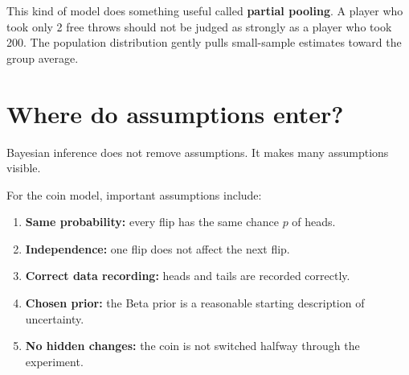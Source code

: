 \documentclass[11pt]{article}
\begin{document}
\begin{center}
\end{center}

This kind of model does something useful called \textbf{partial pooling}. A player who took only 2 free throws should not be judged as strongly as a player who took 200. The population distribution gently pulls small-sample estimates toward the group average.

\section{Where do assumptions enter?}

Bayesian inference does not remove assumptions. It makes many assumptions visible.

\begin{checkbox}
For the coin model, important assumptions include:
\begin{enumerate}[leftmargin=1.5em]
  \item \textbf{Same probability:} every flip has the same chance $p$ of heads.
  \item \textbf{Independence:} one flip does not affect the next flip.
  \item \textbf{Correct data recording:} heads and tails are recorded correctly.
  \item \textbf{Chosen prior:} the Beta prior is a reasonable starting description of uncertainty.
  \item \textbf{No hidden changes:} the coin is not switched halfway through the experiment.
\end{enumerate}
\end{checkbox}
\end{document}
